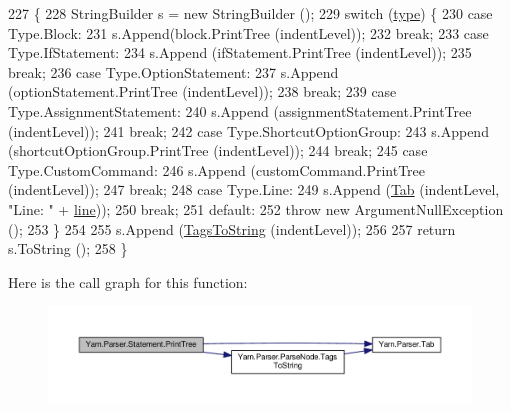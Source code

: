 \begin{DoxyCode}
227             \{
228                 StringBuilder s = \textcolor{keyword}{new} StringBuilder ();
229                 \textcolor{keywordflow}{switch} (\hyperlink{a00160_aa3fa0eb260e412720562ce06b7dc06fe}{type}) \{
230                 \textcolor{keywordflow}{case} Type.Block:
231                     s.Append(block.PrintTree (indentLevel));
232                     \textcolor{keywordflow}{break};
233                 \textcolor{keywordflow}{case} Type.IfStatement:
234                     s.Append (ifStatement.PrintTree (indentLevel));
235                     \textcolor{keywordflow}{break};
236                 \textcolor{keywordflow}{case} Type.OptionStatement:
237                     s.Append (optionStatement.PrintTree (indentLevel));
238                     \textcolor{keywordflow}{break};
239                 \textcolor{keywordflow}{case} Type.AssignmentStatement:
240                     s.Append (assignmentStatement.PrintTree (indentLevel));
241                     \textcolor{keywordflow}{break};
242                 \textcolor{keywordflow}{case} Type.ShortcutOptionGroup:
243                     s.Append (shortcutOptionGroup.PrintTree (indentLevel));
244                     \textcolor{keywordflow}{break};
245                 \textcolor{keywordflow}{case} Type.CustomCommand:
246                     s.Append (customCommand.PrintTree (indentLevel));
247                     \textcolor{keywordflow}{break};
248                 \textcolor{keywordflow}{case} Type.Line:
249                     s.Append (\hyperlink{a00143_aa8fa36b46de12a1c561d77b99c4b9ae3}{Tab} (indentLevel, \textcolor{stringliteral}{"Line: "} + \hyperlink{a00160_a37695c7b00776bb292fd64894a70fb72}{line}));
250                     \textcolor{keywordflow}{break};
251                 \textcolor{keywordflow}{default}:
252                     \textcolor{keywordflow}{throw} \textcolor{keyword}{new} ArgumentNullException ();
253                 \}
254 
255                 s.Append (\hyperlink{a00142_a054f36c80d5eeacd569a8859f599af67}{TagsToString} (indentLevel));
256 
257                 \textcolor{keywordflow}{return} s.ToString ();
258             \}
\end{DoxyCode}


Here is the call graph for this function\-:
\nopagebreak
\begin{figure}[H]
\begin{center}
\leavevmode
\includegraphics[width=350pt]{a00160_aaac6d1e0c3b31f33e1c6f964c205153e_cgraph}
\end{center}
\end{figure}



